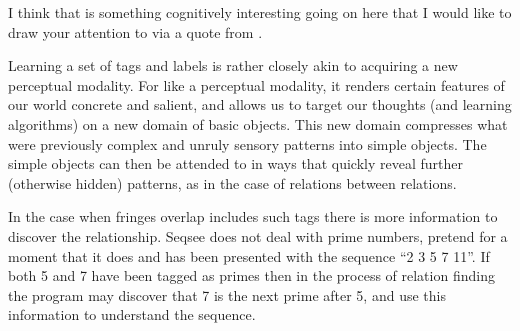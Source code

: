 \documentclass{article}
\begin{document}
I think that is something cognitively interesting going on here that I would like to draw your attention to via a quote from \cite{Clark:MindWare}.

Learning a set of tags and labels is rather closely akin to acquiring a new perceptual modality.  For like a perceptual modality, it renders certain features of our world concrete and salient, and allows us to target our thoughts (and learning algorithms) on a new domain of basic objects.  This new domain compresses what were previously complex and unruly sensory patterns into simple objects.  The simple objects can then be attended to in ways that quickly reveal further (otherwise hidden) patterns, as in the case of relations between relations.

In the case when fringes overlap includes such tags there is more information to discover the relationship.  Seqsee does not deal with prime numbers, pretend for a moment that it does and has been presented with the sequence ``2 3 5 7 11''. If both 5 and 7 have been tagged as primes then in the process of relation finding the program may discover that 7 is the next prime after 5, and use this information to understand the sequence.




\end{document}
